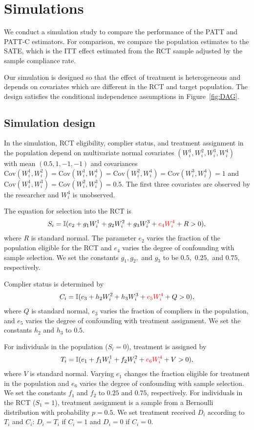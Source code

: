 \documentclass[hidelinks,12pt]{article}
\newcommand{\ind}{\mathbb{I}} %
\newcommand{\cov}{\mathrm{Cov}}
\begin{document}
{\section{Simulations} \label{sim}
{\color{red}We conduct a simulation study to compare the performance of the PATT and PATT-C estimators. For comparison, we compare the population estimates to the SATE, which is the ITT effect estimated from the RCT sample adjusted by the sample compliance rate.}

Our simulation is designed so that the effect of treatment is heterogeneous and depends on covariates which are different in the RCT and target population. The design satisfies the conditional independence assumptions in Figure~\ref{fig:DAG}.

\subsection{Simulation design}
{\color{red}In the simulation, RCT eligibility, complier status, and treatment assignment in the population depend on multivariate normal covariates $(W^{1}_i, W^{2}_i, W^{3}_i, W^{4}_i)$ with mean $(0.5, 1, -1, -1)$ and covariances $\cov(W^{1}_i, W^{2}_i) = \cov(W^{1}_i, W^{4}_i)= \cov(W^{2}_i, W^{4}_i) = \cov(W^{3}_i, W^{4}_i) = 1$ and $\cov(W^{1}_i, W^{3}_i) = \cov(W^{2}_i, W^{3}_i) = 0.5$.  The first three covariates are observed by the researcher and $W^{4}_i$ is unobserved. }

The  equation for selection into the RCT is
 \vskip 0.2in
 $$ S_i = \ind(e_2 + g_1W^{1}_i + g_2W^{2}_i + g_3W^{3}_i + {\color{red}e_4W^{4}_i} + R > 0),$$
 \vskip 0.2in
\noindent
where $R$ is standard normal. The parameter $e_2$ varies the fraction of the population eligible for the RCT and {\color{red}$e_4$ varies the degree of confounding with sample selection.} We set the constants $g_1, g_2,$ and $g_3$ to be $0.5,$ $0.25,$ and $0.75$, respectively.

Complier status is determined by
\vskip 0.2in
$$C_i = \ind(e_3 + h_2W^{2}_i + h_3W^{3}_i + {\color{red}e_5W^{4}_i} + Q > 0),$$
\vskip 0.2in
\noindent
where $Q$ is standard normal, $e_3$ varies the fraction of compliers in the population, and {\color{red}$e_5$ varies the degree of confounding with treatment assignment.} We set the constants $h_2$ and $h_3$ to $0.5$.

For individuals in the population ($S_i=0$), treatment is assigned by
 \vskip 0.2in
  $$T_i = \ind(e_1 + f_1W^{1}_i + f_2W^{2}_i + {\color{red}e_6W^{4}_i} + V > 0),$$
  \vskip 0.2in
\noindent
where $V$ is standard normal. Varying $e_1$ changes the fraction eligible for treatment in the population and {\color{red}$e_6$ varies the degree of confounding with sample selection.} We set the constants $f_1$ and $f_2$ to $0.25$ and $0.75$, respectively. For individuals in the RCT ($S_1=1$), treatment assignment is a sample from a Bernoulli distribution with probability $p=0.5$.
We set treatment received $D_i$ according to $T_i$ and $C_i$: $D_i = T_i$ if $C_i=1$ and $D_i = 0$ if $C_i=0$.

}
\end{document}
